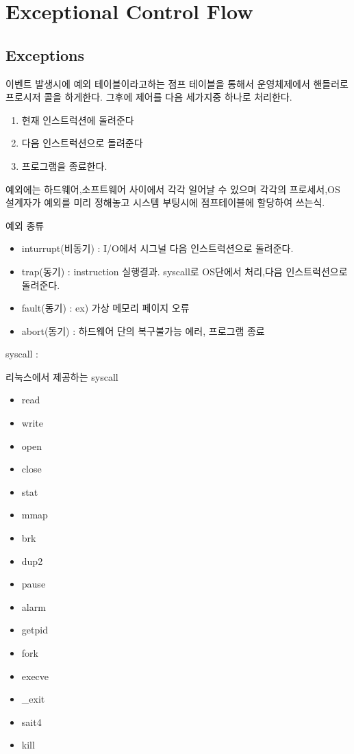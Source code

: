 
\chapter{Exceptional Control Flow}

\section{Exceptions}

이벤트 발생시에 예외 테이블이라고하는 점프 테이블을 통해서 운영체제에서 핸들러로 프로시저 콜을 하게한다.
그후에 제어를 다음 세가지중 하나로 처리한다.

\begin{enumerate}
    \item 현재 인스트럭션에 돌려준다
    \item 다음 인스트럭션으로 돌려준다 
    \item 프로그램을 종료한다.
\end{enumerate}

예외에는 하드웨어,소프트웨어 사이에서 각각 일어날 수 있으며 각각의 프로세서,OS 설계자가 예외를 미리 정해놓고 시스템 부팅시에 점프테이블에 할당하여 쓰는식.

예외 종류
\begin{itemize}
    \item inturrupt(비동기) : I/O에서 시그널  다음 인스트럭션으로 돌려준다.
    \item trap(동기) : instruction 실행결과. syscall로 OS단에서 처리,다음 인스트럭션으로 돌려준다.
    \item fault(동기) : ex) 가상 메모리 페이지 오류
    \item abort(동기) : 하드웨어 단의 복구불가능 에러, 프로그램 종료
\end{itemize}

syscall : 

리눅스에서 제공하는 syscall
\begin{itemize}
    \item read
    \item write
    \item open
    \item close
    \item stat
    \item mmap
    \item brk
    \item dup2
    \item pause
    \item alarm
    \item getpid
    \item fork
    \item execve
    \item _exit
    \item sait4
    \item kill
\end{itemize}

